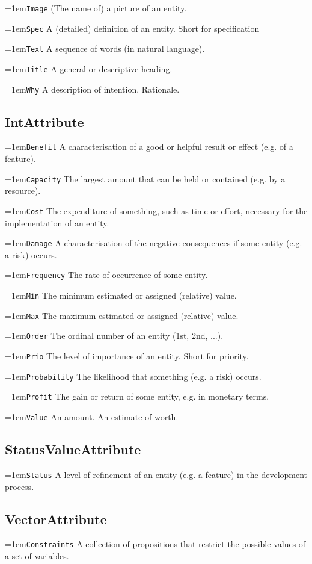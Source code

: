 \documentclass[9pt,a4paper,oneside]{report}
\begin{document}
\begin{multicols*}{4}
\hangindent=1em\lstinline+Image+ (The name of) a picture of an entity.

\hangindent=1em\lstinline+Spec+ A (detailed) definition of an entity. Short for specification

\hangindent=1em\lstinline+Text+ A sequence of words (in natural language).

\hangindent=1em\lstinline+Title+ A general or descriptive heading.

\hangindent=1em\lstinline+Why+ A description of intention. Rationale.

\subsection*{IntAttribute}

\hangindent=1em\lstinline+Benefit+ A characterisation of a good or helpful result or effect (e.g. of a feature).

\hangindent=1em\lstinline+Capacity+ The largest amount that can be held or contained (e.g. by a resource).

\hangindent=1em\lstinline+Cost+ The expenditure of something, such as time or effort, necessary for the implementation of an entity.

\hangindent=1em\lstinline+Damage+ A characterisation of the negative consequences if some entity (e.g. a risk) occurs.

\hangindent=1em\lstinline+Frequency+ The rate of occurrence of some entity. 

\hangindent=1em\lstinline+Min+ The minimum estimated or assigned (relative) value.

\hangindent=1em\lstinline+Max+ The maximum estimated or assigned (relative) value.

\hangindent=1em\lstinline+Order+ The ordinal number of an entity (1st, 2nd, ...).

\hangindent=1em\lstinline+Prio+ The level of importance of an entity. Short for priority.

\hangindent=1em\lstinline+Probability+ The likelihood that something (e.g. a risk) occurs.

\hangindent=1em\lstinline+Profit+ The gain or return of some entity, e.g. in monetary terms.

\hangindent=1em\lstinline+Value+ An amount. An estimate of worth.

\subsection*{StatusValueAttribute}

\hangindent=1em\lstinline+Status+ A level of refinement of an entity (e.g. a feature) in the development process. 

\subsection*{VectorAttribute}

\hangindent=1em\lstinline+Constraints+ A collection of propositions that restrict the possible values of a set of variables.
\end{multicols*}
\end{document}
